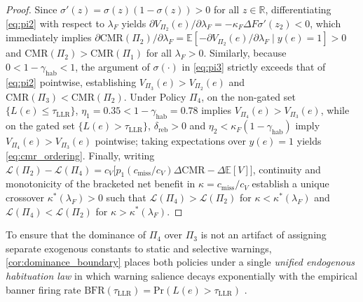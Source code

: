 \documentclass[11pt,a4paper]{article}
\begin{document}
\begin{proof}
Since $\sigma'(z) = \sigma(z)(1 - \sigma(z)) > 0$ for all $z \in \mathbb{R}$, differentiating \cref{eq:pi2} with respect to $\lambda_F$ yields $\partial V_{\Pi_2}(e) / \partial \lambda_F = -\kappa_F \Delta F \sigma'(z_2) < 0$, which immediately implies $\partial \text{CMR}(\Pi_2) / \partial \lambda_F = \mathbb{E}[-\partial V_{\Pi_2}(e) / \partial \lambda_F \mid y(e)=1] > 0$ and $\text{CMR}(\Pi_2) > \text{CMR}(\Pi_1)$ for all $\lambda_F > 0$. Similarly, because $0 < 1 - \gamma_{\text{hab}} < 1$, the argument of $\sigma(\cdot)$ in \cref{eq:pi3} strictly exceeds that of \cref{eq:pi2} pointwise, establishing $V_{\Pi_3}(e) > V_{\Pi_2}(e)$ and $\text{CMR}(\Pi_3) < \text{CMR}(\Pi_2)$. Under Policy $\Pi_4$, on the non-gated set $\{L(e) \le \tau_{\text{LLR}}\}$, $\eta_1 = 0.35 < 1 - \gamma_{\text{hab}} = 0.78$ implies $V_{\Pi_4}(e) > V_{\Pi_3}(e)$, while on the gated set $\{L(e) > \tau_{\text{LLR}}\}$, $\delta_{\text{reb}} > 0$ and $\eta_2 < \kappa_F(1 - \gamma_{\text{hab}})$ imply $V_{\Pi_4}(e) > V_{\Pi_3}(e)$ pointwise; taking expectations over $y(e)=1$ yields \cref{eq:cmr_ordering}. Finally, writing $\mathcal{L}(\Pi_2) - \mathcal{L}(\Pi_4) = c_V \bigl[p_1 (c_{\text{miss}}/c_V) \Delta\text{CMR} - \Delta\mathbb{E}[V]\bigr]$, continuity and monotonicity of the bracketed net benefit in $\kappa = c_{\text{miss}}/c_V$ establish a unique crossover $\kappa^*(\lambda_F) > 0$ such that $\mathcal{L}(\Pi_4) > \mathcal{L}(\Pi_2)$ for $\kappa < \kappa^*(\lambda_F)$ and $\mathcal{L}(\Pi_4) < \mathcal{L}(\Pi_2)$ for $\kappa > \kappa^*(\lambda_F)$.
\end{proof}

To ensure that the dominance of $\Pi_4$ over $\Pi_3$ is not an artifact of assigning separate exogenous constants to static and selective warnings, \cref{cor:dominance_boundary} places both policies under a single \textit{unified endogenous habituation law} in which warning salience decays exponentially with the empirical banner firing rate $\text{BFR}(\tau_{\text{LLR}}) = \text{Pr}(L(e) > \tau_{\text{LLR}})$ \citep{anderson2016warning, vance2018fog}.
\end{document}
